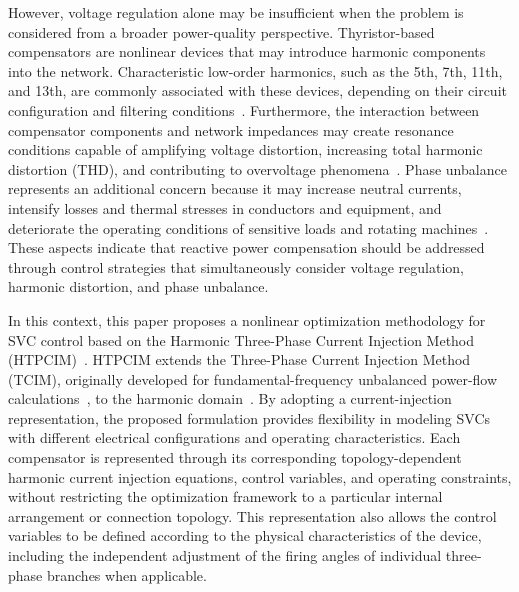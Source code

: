 \documentclass[journal]{IEEEtran}
\begin{document}
However, voltage regulation alone may be insufficient when the problem is considered from a broader power-quality perspective. Thyristor-based compensators are nonlinear devices that may introduce harmonic components into the network. Characteristic low-order harmonics, such as the 5th, 7th, 11th, and 13th, are commonly associated with these devices, depending on their circuit configuration and filtering conditions~\cite{Kraimia2021SVCHarmonics,Zheng2021SVCHarmonicFailure}. Furthermore, the interaction between compensator components and network impedances may create resonance conditions capable of amplifying voltage distortion, increasing total harmonic distortion (THD), and contributing to overvoltage phenomena~\cite{Farzin2022CapacitorResonance}. Phase unbalance represents an additional concern because it may increase neutral currents, intensify losses and thermal stresses in conductors and equipment, and deteriorate the operating conditions of sensitive loads and rotating machines~\cite{Liu2020SVCUnbalance}. These aspects indicate that reactive power compensation should be addressed through control strategies that simultaneously consider voltage regulation, harmonic distortion, and phase unbalance.

In this context, this paper proposes a nonlinear optimization methodology for SVC control based on the Harmonic Three-Phase Current Injection Method (HTPCIM)~\cite{variz2006three}. HTPCIM extends the Three-Phase Current Injection Method (TCIM), originally developed for fundamental-frequency unbalanced power-flow calculations~\cite{garcia2000three}, to the harmonic domain~\cite{variz2006three}. By adopting a current-injection representation, the proposed formulation provides flexibility in modeling SVCs with different electrical configurations and operating characteristics. Each compensator is represented through its corresponding topology-dependent harmonic current injection equations, control variables, and operating constraints, without restricting the optimization framework to a particular internal arrangement or connection topology. This representation also allows the control variables to be defined according to the physical characteristics of the device, including the independent adjustment of the firing angles of individual three-phase branches when applicable.
\end{document}
